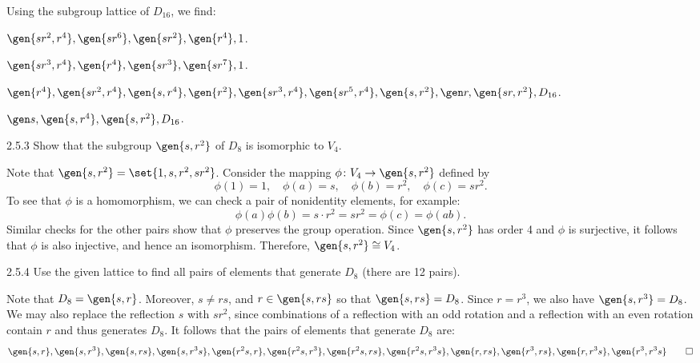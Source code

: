 \begin{sol}
    Using the subgroup lattice of $D_{16}$, we find:
    \begin{subexercises}
        \item $\gen{sr^2, r^4}, \gen {sr^6}, \gen{sr^2}, \gen{r^4}, 1$.
        \item $\gen{sr^3, r^4}, \gen{r^4}, \gen{sr^3}, \gen{sr^7}, 1$.
        \item $\gen{r^4}, \gen{sr^2, r^4}, \gen{s, r^4}, \gen{r^2}, \gen{sr^3, r^4}, \gen{sr^5, r^4}, \gen{s, r^2}, \gen r, \gen{sr, r^2}, D_{16}$.
        \item $\gen s, \gen{s, r^4}, \gen{s, r^2}, D_{16}$. \qedhere
    \end{subexercises}
\end{sol}

\begin{exercise}{2.5.3}
    Show that the subgroup $\gen{s, r^2}$ of $D_8$ is isomorphic to $V_4$.
\end{exercise}

\begin{sol}
    Note that $\gen{s, r^2} = \set{1, s, r^2, sr^2}$.
	Consider the mapping $\phi \colon V_4 \to \gen{s, r^2}$ defined by
    \[
    	\phi(1) = 1, \quad \phi(a) = s, \quad \phi(b) = r^2, \quad \phi(c) = sr^2.
    \]
    To see that $\phi$ is a homomorphism, we can check a pair of nonidentity elements, for example:
    \[
    	\phi(a)\phi(b) = s \cdot r^2 = sr^2 = \phi(c) = \phi(ab).
    \]
    Similar checks for the other pairs show that $\phi$ preserves the group operation.
	Since $\gen{s, r^2}$ has order 4 and $\phi$ is surjective, it follows that $\phi$ is also injective, and hence an isomorphism.
	Therefore, $\gen{s, r^2} \cong V_4$.
\end{sol}

\begin{exercise}{2.5.4}
    Use the given lattice to find all pairs of elements that generate $D_8$ (there are 12 pairs).
\end{exercise}

\begin{sol}
    Note that $D_8 = \gen{s, r}$.
	Moreover, $s \neq rs$, and $r \in \gen{s, rs}$ so that $\gen{s, rs} = D_8$.
	Since $r = r^3$, we also have $\gen{s, r^3} = D_8$.
	We may also replace the reflection $s$ with $sr^2$, since combinations of a reflection with an odd rotation and a reflection with an even rotation contain $r$ and thus generates $D_8$.
	It follows that the pairs of elements that generate $D_8$ are:
    \[
    	\gen{s, r}, \gen{s, r^3}, \gen{s, rs}, \gen{s, r^3s}, \gen{r^2s, r}, \gen{r^2s, r^3}, \gen{r^2s, rs}, \gen{r^2s, r^3s}, \gen{r, rs}, \gen{r^3, rs}, \gen{r, r^3s}, \gen{r^3, r^3s} \qedhere
    \]
\end{sol}

